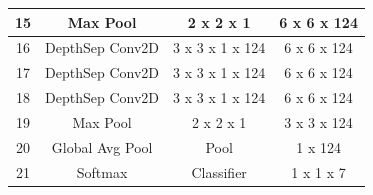 \documentclass[master]{thesis-uestc}
\begin{document}
\begin{table}[ht]
\begin{center}
\begin{tabular}{|c|c|c|c|}
15 & Max Pool & 2 x 2 x 1 & 6 x 6 x 124\\ \hline

16 & DepthSep Conv2D & 3 x 3 x 1 x 124 & 6 x 6 x 124\\ \hline
17 & DepthSep Conv2D & 3 x 3 x 1 x 124 & 6 x 6 x 124\\ \hline
18 & DepthSep Conv2D & 3 x 3 x 1 x 124 & 6 x 6 x 124\\ \hline

19 & Max Pool & 2 x 2 x 1 & 3 x 3 x 124\\ \hline

20 & Global Avg Pool & Pool & 1 x 124\\ \hline
21 & Softmax & Classifier & 1 x 1 x 7\\ \hline

\end{tabular}
\end{center}
\end{table}

\end{document}
